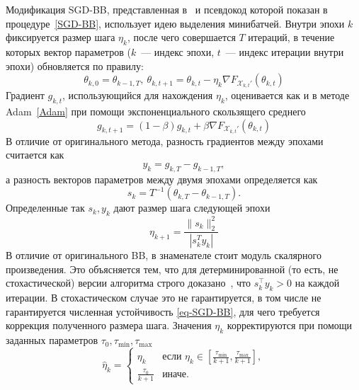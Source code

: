 \documentclass[preprint,12pt]{elsarticle}
\begin{document}
Модификация SGD-BB, представленная в~\cite{BB-DL} и псевдокод которой показан в процедуре~\ref{SGD-BB}, использует идею выделения минибатчей. Внутри эпохи $k$ фиксируется размер шага $\eta_k$, после чего совершается $T$ итераций, в течение которых вектор параметров ($k$~--- индекс эпохи, $t$~--- индекс итерации внутри эпохи) обновляется по правилу:
$$\theta_{k, 0} = \theta_{k-1, T},~\theta_{k, t+1} = \theta_{k, t} - {\eta}_k \nabla F_{\mathcal{X}_{k, t}'}(\theta_{k, t})$$
Градиент $g_{k, t}$, использующийся для нахождения ${\eta_k}$, оценивается как и в методе Adam~\ref{Adam} при помощи экспоненциального скользящего среднего
$$g_{k, t+1} = (1 - \beta) g_{k, t} + \beta \nabla F_{\mathcal{X}_{k, t}'}(\theta_{k, t})$$
В отличие от оригинального метода, разность градиентов между эпохами считается как
$$y_k = g_{k, T} - g_{k-1, T},$$
а разность векторов параметров между двумя эпохами определяется как
$$s_k = T^{-1}(\theta_{k, T} - \theta_{k-1, T}).$$
Определенные так $s_k, y_k$ дают размер шага следующей эпохи
\begin{equation}\label{eq-SGD-BB}
    \eta_{k+1} = \frac{\|s_k\|_2^2}{|s_k^Ty_k|}
\end{equation}
В отличие от оригинального BB, в знаменателе стоит модуль скалярного произведения. Это объясняется тем, что для детерминированной (то есть, не стохастической) версии алгоритма строго доказано~\cite{BBconvergence}, что $s_k^\top y_k > 0$ на каждой итерации. В стохастическом случае это не гарантируется, в том числе не гарантируется численная устойчивость \eqref{eq-SGD-BB}, для чего требуется коррекция полученного размера шага.
Значения $\eta_k$ корректируются при помощи заданных параметров $\tau_0, \tau_{\text{min}}, \tau_{\text{max}}$
$$\hat{\eta}_k = \begin{cases}
        \eta_k & \text{если } \eta_k \in \left[\frac{\tau_{\text{min}}}{k+1}, \frac {\tau_{\text{max}}}{k+1}\right], \\
        \frac{\tau_0}{k+1} & \text{иначе.}
    \end{cases}$$
\end{document}
